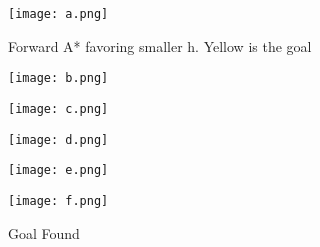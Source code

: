 \documentclass{article}
\begin{document}
\begin{figure}
  \texttt{[image: a.png]}
  \caption{Forward A* favoring smaller h.  Yellow is the goal}
 \end{figure}
 \begin{figure}
  \texttt{[image: b.png]}
 \end{figure}
 \begin{figure}
  \texttt{[image: c.png]}
 \end{figure}
 \begin{figure}
  \texttt{[image: d.png]}
 \end{figure}
 \begin{figure}
  \texttt{[image: e.png]}
 \end{figure}
 \begin{figure}
  \texttt{[image: f.png]}
  \caption{Goal Found}
 \end{figure}
\end{document}
